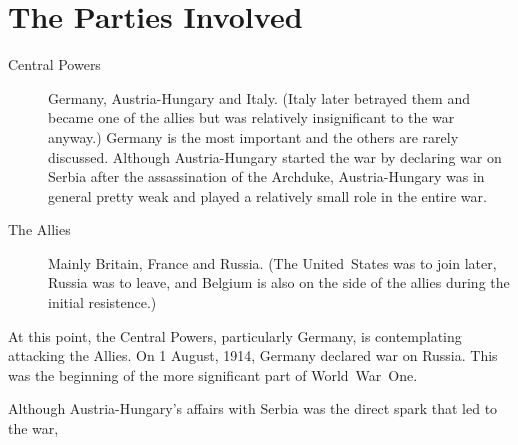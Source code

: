 \documentclass[a4paper,numbers=endperiod,most,twoside,english,final,openany]{scrbook} %
\makeatletter
\newcommand{\twocolumntableofcontents}{\begingroup\setlength{\columnsep}{2cm}
\twocolumn\tableofcontents\onecolumn\endgroup}
\renewcommand{\mainmatter}{\if@twoside\cleardoubleoddpage\else\clearpage\fi \@mainmattertrue}
\newcommand*{\openawareclearpage}{\if@openright\cleardoublepage\else\clearpage\fi}
\renewcommand{\chaptername}{Topic}
\makeatother
\begin{document}
\openawareclearpage%
%
\twocolumntableofcontents

\renewcommand{\chaptername}{Topic} %
\mainmatter\renewcommand{\chaptermark}[1]{\markboth{\MakeUppercase{#1}\quad{}(\chaptername\ \thechapter)}{\MakeUppercase{#1}\quad{}(\chaptername\ \thechapter)}}


\chapter{The Parties Involved}

\begin{description}
	\item [Central Powers] Germany, Austria-Hungary and Italy. (Italy later betrayed them and became one of the allies but was relatively insignificant to the war anyway.) Germany is the most important and the others are rarely discussed. Although Austria-Hungary started the war by declaring war on Serbia after the assassination of the Archduke, Austria-Hungary was in general pretty weak and played a relatively small role in the entire war.
	\item [The Allies] Mainly Britain, France and Russia. (The United~States was to join later, Russia was to leave, and Belgium is also on the side of the allies during the initial resistence.)
\end{description}
At this point, the Central Powers, particularly Germany, is contemplating attacking the Allies. On 1 August, 1914, Germany declared war on Russia. This was the beginning of the more significant part of World~War~One.

Although Austria-Hungary's affairs with Serbia was the direct spark that led to the war,
\end{document}
